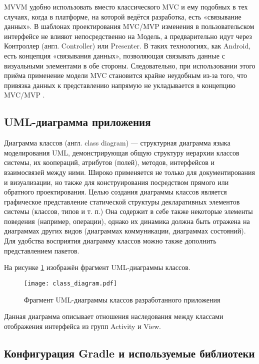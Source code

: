 MVVM удобно использовать вместо классического MVC и ему подобных в тех случаях, когда в платформе, на которой ведётся разработка, есть «связывание данных».
В шаблонах проектирования MVC/MVP изменения в пользовательском интерфейсе не влияют непосредственно на Mодель, а предварительно идут через Контроллер (англ. Controller) или Presenter.
В таких технологиях, как Android, есть концепция «связывания данных», позволяющая связывать данные с визуальными элементами в обе стороны.
Следовательно, при использовании этого приёма применение модели MVC становится крайне неудобным из-за того, что привязка данных к представлению напрямую не укладывается в концепцию MVC/MVP \cite{android_view_model}.

\subsection{UML-диаграмма приложения}
\label{sub:arch:struct}

Диаграмма классов (англ. class diagram) — структурная диаграмма языка моделирования UML, демонстрирующая общую структуру иерархии классов системы, их коопераций, атрибутов (полей), методов, интерфейсов и взаимосвязей между ними. Широко применяется не только для документирования и визуализации, но также для конструирования посредством прямого или обратного проектирования.
Целью создания диаграммы классов является графическое представление статической структуры декларативных элементов системы (классов, типов и т. п.) Она содержит в себе также некоторые элементы поведения (например, операции), однако их динамика должна быть отражена на диаграммах других видов (диаграммах коммуникации, диаграммах состояний). Для удобства восприятия диаграмму классов можно также дополнить представлением пакетов.

На рисунке \ref{fig:uml_diagram} изображён фрагмент UML-диаграммы классов.

\begin{figure}[ht]
    \centering
    \texttt{[image: class\_diagram.pdf]}
    \caption{Фрагмент UML-диаграммы классов разработанного приложения}
	\label{fig:uml_diagram}
\end{figure}

Данная диаграмма описывает отношения наследования между классами отображения интерфейса из групп Activity и View.

\subsection{Конфигурация Gradle и используемые библиотеки}
\label{sub:arch:deps}

